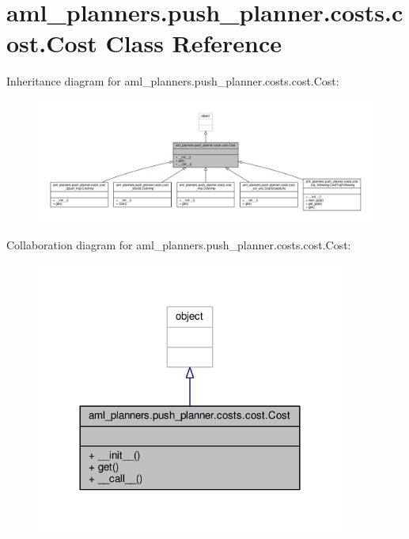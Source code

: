 \hypertarget{classaml__planners_1_1push__planner_1_1costs_1_1cost_1_1_cost}{\section{aml\-\_\-planners.\-push\-\_\-planner.\-costs.\-cost.\-Cost Class Reference}
\label{classaml__planners_1_1push__planner_1_1costs_1_1cost_1_1_cost}
}


Inheritance diagram for aml\-\_\-planners.\-push\-\_\-planner.\-costs.\-cost.\-Cost\-:\nopagebreak
\begin{figure}[H]
\begin{center}
\leavevmode
\includegraphics[width=350pt]{classaml__planners_1_1push__planner_1_1costs_1_1cost_1_1_cost__inherit__graph}
\end{center}
\end{figure}


Collaboration diagram for aml\-\_\-planners.\-push\-\_\-planner.\-costs.\-cost.\-Cost\-:\nopagebreak
\begin{figure}[H]
\begin{center}
\leavevmode
\includegraphics[width=288pt]{classaml__planners_1_1push__planner_1_1costs_1_1cost_1_1_cost__coll__graph}
\end{center}
\end{figure}
